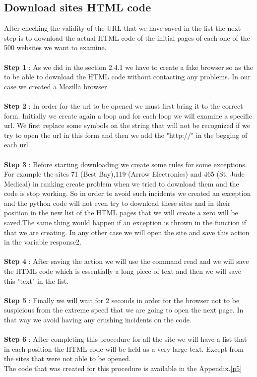 \documentclass{book}
\begin{document}
\subsection{Download sites HTML code}
After checking the validity of the URL that we have saved in the list the next step is to download the actual HTML code of the initial pages of each one of the 500 websites we want to examine.\\\\
\textbf{Step 1} : As we did in the section 2.4.1 we have to create a fake browser so as the to be able to download the HTML code without contacting any problems. In our case we created a Mozilla browser.\\\\
\textbf{Step 2} : In order for the url to be opened we must first bring it to the correct form. Initially we create again a loop and for each loop we will examine a specific url. We first replace some symbols on the string that will not be recognized if we try to open the url in this form and then we add the "http://" in the begging of each url.\\ \\
\textbf{Step 3} : Before starting downloading we create some rules for some exceptions. For example the sites 71 (Best Bay),119 (Arrow Electronics) and 465 (St. Jude Medical) in ranking create problem when we tried to download them and the code is stop working. So in order to avoid such incidents we created an exception and the python code will not even try to download these sites and in their position in the new list of the HTML pages that we will create a zero will be saved.The same thing would happen if an exception is thrown in the function if that we are creating. In any other case we will open the site and save this action in the variable response2.\\\\
\textbf{Step 4} : After saving the action we will use the command read and we will save the HTML code which is essentially a long piece of text and then we will save this "text" in the list.\\\\
\textbf{Step 5} : Finally we will wait for 2 seconds in order for the browser not to be suspicious from the extreme speed that we are going to open the next page. In that way we avoid having any crushing incidents on the code.\\\\
\textbf{Step 6} : After completing this procedure for all the site we will have a list that in each position the HTML code will be held as a very large text. Except from the sites that were not able to be opened.\\
The code that was created for this procedure is available in the Appendix.\ref{p5}
\end{document}
